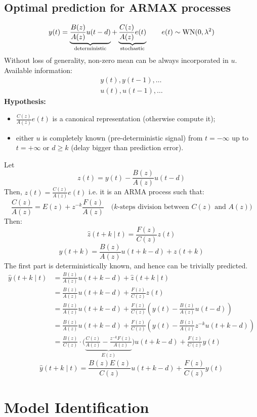 \section{Optimal prediction for ARMAX processes}

\[
	y(t)=\underbrace{\frac{B(z)}{A(z)} u(t-d)}_{\text{deterministic}}+
	\underbrace{\frac{C(z)}{A(z)} e(t)}_{\text{stochastic}}\qquad e(t)\sim \operatorname{WN}(0,\lambda^2 )
\]
Without loss of generality, non-zero mean can be always incorporated in $u$. Available information:
\begin{gather*}
	y(t),y(t-1),\ldots \\
	u(t),u(t-1),\ldots
\end{gather*}
\textbf{Hypothesis:}
\begin{itemize}
	\item $\frac{C(z)}{A(z)}e(t)$ is a canonical representation (otherwise compute it);
	\item either $u$ is completely known (pre-deterministic signal) from $t=-\infty$ up to $t=+\infty$ or $d\geq k$ (delay bigger than prediction error).
\end{itemize}
Let 
$$
	z(t)=y(t)-\frac{B(z)}{A(z)} u(t-d)
$$
Then, $z(t)=\frac{C(z)}{A(z)} e(t)$ i.e. it is an ARMA process such that:
$$
	\frac{C(z)}{A(z)}=E(z)+z^{-k} \frac{F(z)}{A(z)} \quad\text{($k$-steps division between $C(z)$ and $A(z)$)}
$$
Then:
$$
	\hat{z}(t+k \mid t)=\frac{F(z)}{C(z)} z(t)
$$
$$
	y(t+k)=\frac{B(z)}{A(z)} u(t+k-d)+z(t+k)
$$
The first part is deterministically known, and hence can be trivially predicted.
\begin{align*}
	\hat{y}(t+k \mid t)&=\frac{B(z)}{A(z)} u(t+k-d)+\hat{z}(t+k \mid t) \\
	&=\frac{B(z)}{A(z)} u(t+k-d)+\frac{F(z)}{C(z)} z(t) \\
	& =\frac{B(z)}{A(z)} u(t+k-d)+\frac{F(z)}{C(z)}\left(y(t)-\frac{B(z)}{A(z)} u(t-d)\right) \\
	& =\frac{B(z)}{A(z)} u(t+k-d)+\frac{F(z)}{C(z)}\left(y(t)-\frac{B(z)}{A(z)} z^{-k}u(t+k-d)\right) \\
	&=\frac{B(z)}{C(z)} \cdot\Bigg(\underbrace{\frac{C(z)}{A(z)}-\frac{z^{-k} F(z)}{A(z)}}_{E(z)}\Bigg) u(t+k-d)+\frac{F(z)}{C(z)} y(t)
\end{align*}
$$
	\boxed{\hat{y}(t+k \mid t) =\frac{B(z) E(z)}{C(z)} u(t+k-d)+\frac{F(z)}{C(z)} y(t)}
$$

\chapter{Model Identification}

